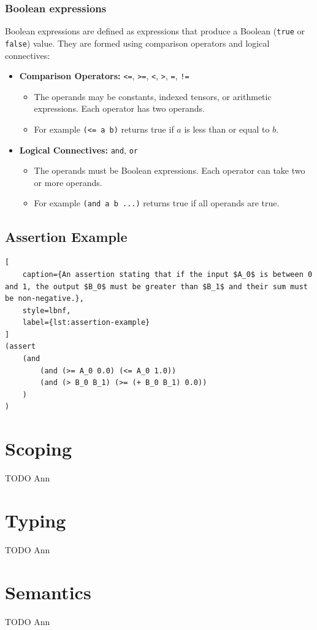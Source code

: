 \subsubsection*{Boolean expressions}
Boolean expressions are defined as expressions that produce a Boolean (\texttt{true} or \texttt{false}) value. They are formed using comparison operators and logical connectives:
\begin{itemize}
    \item \textbf{Comparison Operators:} \texttt{<=}, \texttt{>=}, \texttt{<}, \texttt{>}, \texttt{=}, \texttt{!=}
    \begin{itemize}
        \item The operands may be constants, indexed tensors, or arithmetic expressions. Each operator has two operands.
        \item For example \texttt{(<= a b)} returns true if $a$ is less than or equal to $b$.
    \end{itemize}
    \item \textbf{Logical Connectives:} \texttt{and}, \texttt{or}
    \begin{itemize}
        \item The operands must be Boolean expressions. Each operator can take two or more operands.
        \item For example \texttt{(and a b ...)} returns true if all operands are true.
    \end{itemize}
\end{itemize}

\subsection*{Assertion Example}
\begin{lstlisting}[
    caption={An assertion stating that if the input $A_0$ is between 0 and 1, the output $B_0$ must be greater than $B_1$ and their sum must be non-negative.},
    style=lbnf,
    label={lst:assertion-example}
]
(assert
    (and
        (and (>= A_0 0.0) (<= A_0 1.0))
        (and (> B_0 B_1) (>= (+ B_0 B_1) 0.0))
    )
)
\end{lstlisting}

\section{Scoping}
\label{sec:scoping}

TODO Ann

\section{Typing}
\label{sec:typing}

TODO Ann

\section{Semantics}
\label{sec:semantics}

TODO Ann

